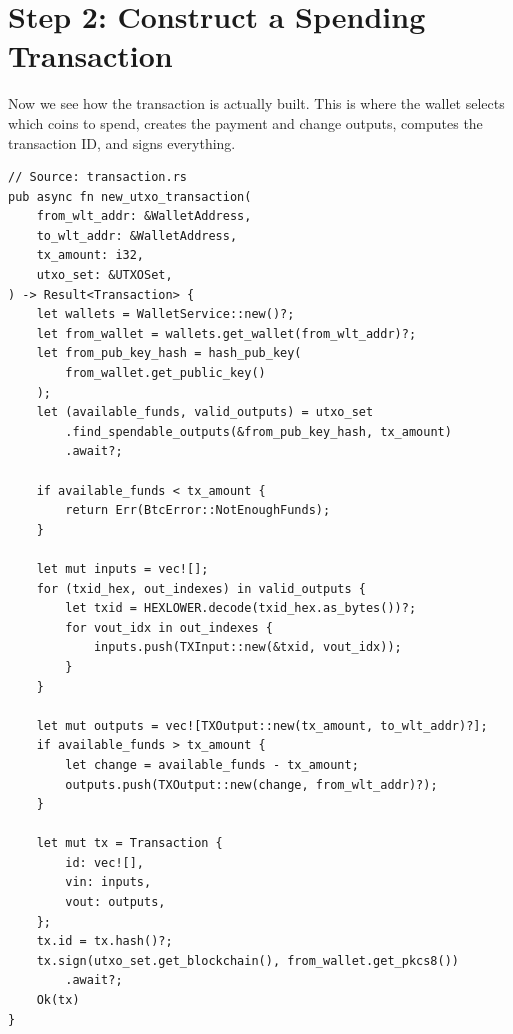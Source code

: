 \section{Step 2: Construct a Spending Transaction}
\label{sec:ch09-5-step2}

Now we see how the transaction is actually built. This is where the wallet selects which coins to spend, creates the payment and change outputs, computes the transaction ID, and signs everything.

\begin{listing}[htbp]
\caption{ --- build and sign}
\label{lst:ch09-5-3}
\begin{verbatim}
// Source: transaction.rs
pub async fn new_utxo_transaction(
    from_wlt_addr: &WalletAddress,
    to_wlt_addr: &WalletAddress,
    tx_amount: i32,
    utxo_set: &UTXOSet,
) -> Result<Transaction> {
    let wallets = WalletService::new()?;
    let from_wallet = wallets.get_wallet(from_wlt_addr)?;
    let from_pub_key_hash = hash_pub_key(
        from_wallet.get_public_key()
    );
    let (available_funds, valid_outputs) = utxo_set
        .find_spendable_outputs(&from_pub_key_hash, tx_amount)
        .await?;

    if available_funds < tx_amount {
        return Err(BtcError::NotEnoughFunds);
    }

    let mut inputs = vec![];
    for (txid_hex, out_indexes) in valid_outputs {
        let txid = HEXLOWER.decode(txid_hex.as_bytes())?;
        for vout_idx in out_indexes {
            inputs.push(TXInput::new(&txid, vout_idx));
        }
    }

    let mut outputs = vec![TXOutput::new(tx_amount, to_wlt_addr)?];
    if available_funds > tx_amount {
        let change = available_funds - tx_amount;
        outputs.push(TXOutput::new(change, from_wlt_addr)?);
    }

    let mut tx = Transaction {
        id: vec![],
        vin: inputs,
        vout: outputs,
    };
    tx.id = tx.hash()?;
    tx.sign(utxo_set.get_blockchain(), from_wallet.get_pkcs8())
        .await?;
    Ok(tx)
}
\end{verbatim}
\end{listing}

